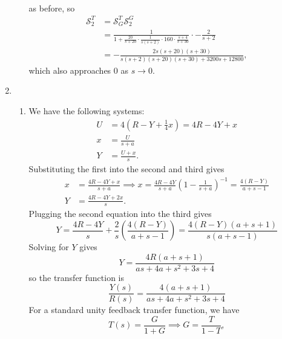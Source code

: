 \documentclass{article}
\numberwithin{equation}{section}
\begin{document}
\begin{enumerate}[label=\textbf{2.\arabic*}]
\begin{enumerate}[label=(\alph*)]
\begin{align}
        \end{align}
        as before, so 
        \begin{align}
            \mathcal{S}^T_2 &= \mathcal{S}^T_G \mathcal{S}^G_2 \\ 
            &= \frac{1}{1+\frac{20}{s+20} \cdot \frac{1}{s(s+2)} \cdot 160 \cdot \frac{s+4}{s+30}} \cdot  -\frac{2}{s + 2}  \\ 
            &= - \frac{2 s (s + 20) (s + 30)}{s (s + 2) (s + 20) (s + 30) + 3200 s + 12800},
        \end{align}
        which also approaches $0$ as $s\to 0.$
    \end{enumerate}
    \item \begin{enumerate}[label=(\alph*)]
        \item We have the following systems:
        \begin{align}
            U &= 4\left(R - Y + \frac{1}{4}x\right) = 4R - 4Y + x \\
            x &= \frac{U}{s+a} \\ 
            Y &= \frac{U+x}{s}.
        \end{align}
        Substituting the first into the second and third gives 
        \begin{align}
            x &= \frac{4R-4Y+x}{s+a} \implies x = \frac{4R-4Y}{s+a}\left(1 - \frac{1}{s+a}\right)^{-1} = \frac{4 (R - Y)}{a + s - 1}\\ 
            Y &= \frac{4R-4Y+2x}{s}.
        \end{align}
        Plugging the second equation into the third gives 
        \begin{equation}
            Y = \frac{4R-4Y}{s} + \frac{2}{s}\left(\frac{4 (R - Y)}{a + s - 1}\right) = \frac{4 (R - Y) (a + s + 1)}{s (a + s - 1)}
        \end{equation}
        Solving for $Y$ gives 
        \begin{equation}
            Y = \frac{4 R (a + s + 1)}{a s + 4 a + s^{2} + 3 s + 4}
        \end{equation}
        so the transfer function is 
        \begin{equation}
            \frac{Y(s)}{R(s)} = \frac{4 (a + s + 1)}{a s + 4 a + s^{2} + 3 s + 4}
        \end{equation}
        For a standard unity feedback transfer function, we have 
        \begin{equation}
            T(s) = \frac{G}{1+G} \implies G = \frac{T}{1-T},

\end{equation}
\end{enumerate}
\end{enumerate}
\end{document}
